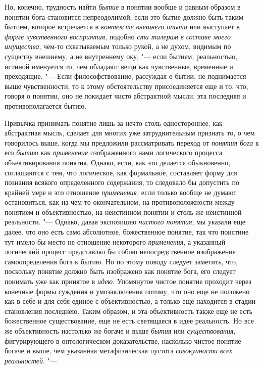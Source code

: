 Но, конечно, трудность найти {\em бытие} в понятии
вообще и равным образом в понятии бога становится непреодолимой, если это
бытие должно быть таким бытием, которое встречается в
{\em контексте внешнего опыта} или выступает в {\em форме
чувственного восприятия}, подобно {\em ста талерам в составе моего
имущества}, чем-то схватываемым только рукой, а не духом,
видимым по существу внешнему, а не внутреннему оку, "--- если
бытием, реальностью, истиной именуется то, чем обладают вещи как
чувственные, временные и преходящие. "--- Если
философствование, рассуждая о бытии, не поднимается выше чувственности, то
к этому обстоятельству присоединяется еще и то, что, говоря о понятии, оно
не покидает чисто абстрактной мысли; эта последняя и противополагается бытию.

Привычка принимать понятие лишь за нечто столь одностороннее,
как абстрактная мысль, сделает для многих уже затруднительным признать то,
о чем говорилось выше, когда мы предложили рассматривать переход от
{\em понятия бога} к его {\em бытию} как {\em применение}
изображенного нами логического процесса объективирования
понятия. Однако, если, как это делается обыкновенно, соглашаются с тем, что
логическое, как формальное, составляет форму для познания всякого
определенного содержания, то следовало бы допустить по крайней мере и это
отношение {\em применения},
если только вообще не думают остановиться, как на чем-то
окончательном, на противоположности между понятием и объективностью, на
неистинном понятии и столь же неистинной реальности. "---
Однако, давая экспозицию {\em чистого понятия}, мы
указали еще далее, что оно есть само абсолютное, божественное понятие, так
что поистине тут имело бы место не отношение некоторого {\em применения}, а
указанный логический процесс представлял бы собою непосредственное
изображение самоопределения бога к бытию. Но по этому поводу следует
заметить, что, поскольку понятие должно быть изображено как понятие бога,
его следует понимать уже как принятое в {\em идею}. Упомянутое
чистое понятие проходит через конечные формы суждения и
умозаключения потому, что оно еще не положено как в себе и для себя единое
с объективностью, а только еще находится в стадии становления последнею.
Таким образом, и эта объективность также еще не есть божественное
существование, еще не есть светящаяся в идее реальность. Но все же
объективность настолько же богаче и выше {\em бытия} или {\em существования},
фигурирующего в онтологическом доказательстве, насколько
чистое понятие богаче и выше, чем указанная метафизическая пустота
{\em совокупности всех реальностей}. "---
